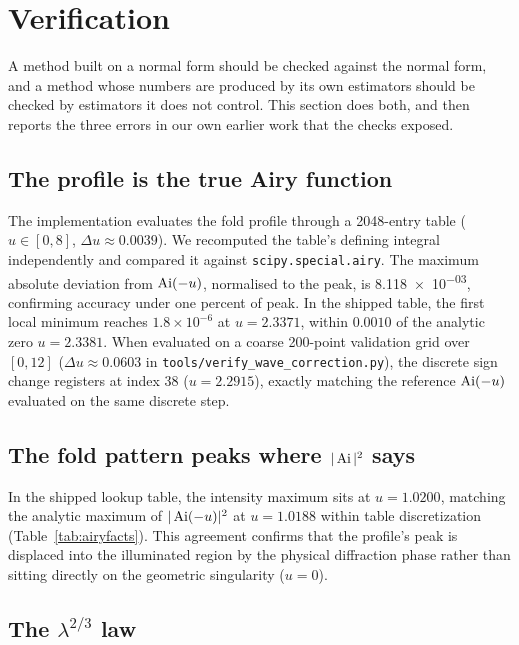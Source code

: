\section{Verification}
\label{sec:verify}

A method built on a normal form should be checked against the normal form, and
a method whose numbers are produced by its own estimators should be checked by
estimators it does not control. This section does both, and then reports the
three errors in our own earlier work that the checks exposed.

\subsection{The profile is the true Airy function}
\label{sec:verify-profile}

The implementation evaluates the fold profile through a 2048-entry table
($u \in [0, 8]$, $\Delta u \approx 0.0039$). We recomputed the table's defining
integral independently and compared it against \verb|scipy.special.airy|. The
maximum absolute deviation from $\operatorname{Ai}(-u)$, normalised to the peak, is
\num{8.118e-03}, confirming accuracy under one percent of peak.
In the shipped table, the first local minimum reaches $1.8 \times 10^{-6}$ at
$u = 2.3371$, within $0.0010$ of the analytic zero $u = 2.3381$. When evaluated
on a coarse 200-point validation grid over $[0, 12]$ ($\Delta u \approx 0.0603$
in \texttt{tools/verify\_wave\_correction.py}), the discrete sign change registers
at index 38 ($u = 2.2915$), exactly matching the reference $\operatorname{Ai}(-u)$ evaluated
on the same discrete step.

\subsection{The fold pattern peaks where $|\operatorname{Ai}|^2$ says}
\label{sec:verify-peak}

In the shipped lookup table, the intensity maximum sits at $u = 1.0200$, matching
the analytic maximum of $|\operatorname{Ai}(-u)|^2$ at $u = 1.0188$ within table discretization
(Table~\ref{tab:airyfacts}). This agreement confirms that the profile's peak
is displaced into the illuminated region by the physical diffraction phase rather
than sitting directly on the geometric singularity ($u=0$).

\subsection{The $\lambda^{2/3}$ law}
\label{sec:verify-scaling}

